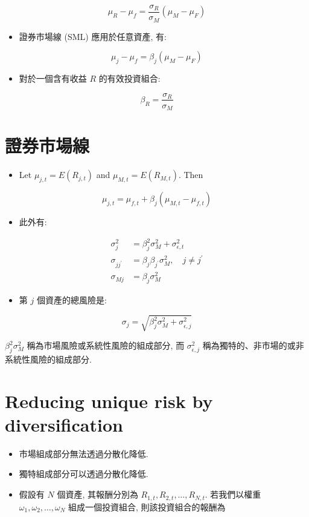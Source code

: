 \documentclass[letterpaper]{article}
\begin{document}
$$
\mu_{R}-\mu_{f}=\frac{\sigma_{R}}{\sigma_{M}}\left (\mu_{M}-\mu_{F}\right) 
$$

\begin{itemize}
  \item  證券市場線 (SML) 應用於任意資產, 有: 
\end{itemize}

$$
\mu_{j}-\mu_{f}=\beta_{j}\left (\mu_{M}-\mu_{F}\right) 
$$

\begin{itemize}
  \item 對於一個含有收益 $R$ 的有效投資組合: 
\end{itemize}

$$
\beta_{R}=\frac{\sigma_{R}}{\sigma_{M}}
$$

\section{證券市場線}
\begin{itemize}
  \item Let $\mu_{j, t}=E\left (R_{j, t}\right) $ and $\mu_{M, t}=E\left (R_{M, t}\right) $. Then
\end{itemize}

$$
\mu_{j, t}=\mu_{f, t}+\beta_{j}\left (\mu_{M, t}-\mu_{f, t}\right) 
$$

\begin{itemize}
  \item 此外有: 
\end{itemize}

$$
\begin{aligned}
\sigma_{j}^{2} & =\beta_{j}^{2} \sigma_{M}^{2}+\sigma_{\epsilon, t}^{2} \\
\sigma_{j j^{\prime}} & =\beta_{j} \beta_{j^{\prime}} \sigma_{M}^{2}, \quad j \neq j^{\prime} \\
\sigma_{M j} & =\beta_{j} \sigma_{M}^{2}
\end{aligned}
$$

\begin{itemize}
\item 第 \( j \) 個資產的總風險是: 
\end{itemize}

$$
\sigma_{j}=\sqrt{\beta_{j}^{2} \sigma_{M}^{2}+\sigma_{\epsilon, j}^{2}}
$$

$\beta_{j}^{2} \sigma_{M}^{2}$ 稱為市場風險或系統性風險的組成部分, 而 $\sigma_{\epsilon, j}^{2}$ 稱為獨特的、非市場的或非系統性風險的組成部分. 


\section{Reducing unique risk by diversification}
\begin{itemize}
	\item 市場組成部分無法透過分散化降低. 
	\item 獨特組成部分可以透過分散化降低. 
	\item 假設有 $N$ 個資產, 其報酬分別為 $R_{1, t}, R_{2, t}, \ldots, R_{N, t}$. 若我們以權重 $\omega_{1}, \omega_{2}, \ldots, \omega_{N}$ 組成一個投資組合, 則該投資組合的報酬為
\end{itemize}
\end{document}

